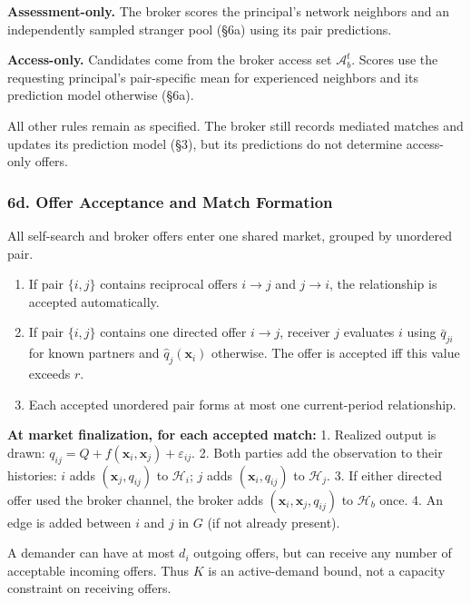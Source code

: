 \documentclass[11pt]{article}
\providecommand{\tightlist}{%
  \setlength{\itemsep}{0pt}\setlength{\parskip}{0pt}}
\begin{document}
\textbf{Assessment-only.} The broker scores the principal's network neighbors and an independently sampled stranger pool (§6a) using its pair predictions.

\textbf{Access-only.} Candidates come from the broker access set \(\mathcal A_b^t\). Scores use the requesting principal's pair-specific mean for experienced neighbors and its prediction model otherwise (§6a).

All other rules remain as specified. The broker still records mediated matches and updates its prediction model (§3), but its predictions do not determine access-only offers.

\subsubsection{6d. Offer Acceptance and Match Formation}\label{d.-offer-acceptance-and-match-formation}

All self-search and broker offers enter one shared market, grouped by unordered pair.

\begin{enumerate}
\def\labelenumi{\arabic{enumi}.}
\tightlist
\item If pair \(\{i,j\}\) contains reciprocal offers \(i \to j\) and \(j \to i\), the relationship is accepted automatically.
\item If pair \(\{i,j\}\) contains one directed offer \(i \to j\), receiver \(j\) evaluates \(i\) using \(\bar{q}_{ji}\) for known partners and \(\hat{q}_j(\mathbf{x}_i)\) otherwise. The offer is accepted iff this value exceeds \(r\).
\item Each accepted unordered pair forms at most one current-period relationship.
\end{enumerate}

\textbf{At market finalization, for each accepted match:} 1. Realized output is drawn: \(q_{ij} = Q + f(\mathbf{x}_i, \mathbf{x}_j) + \varepsilon_{ij}\). 2. Both parties add the observation to their histories: \(i\) adds \((\mathbf{x}_j, q_{ij})\) to \(\mathcal{H}_{i}\); \(j\) adds \((\mathbf{x}_i, q_{ij})\) to \(\mathcal{H}_{j}\). 3. If either directed offer used the broker channel, the broker adds \((\mathbf{x}_i, \mathbf{x}_j, q_{ij})\) to \(\mathcal{H}_b\) once. 4. An edge is added between \(i\) and \(j\) in \(G\) (if not already present).

A demander can have at most \(d_i\) outgoing offers, but can receive any number of acceptable incoming offers. Thus \(K\) is an active-demand bound, not a capacity constraint on receiving offers.
\end{document}
